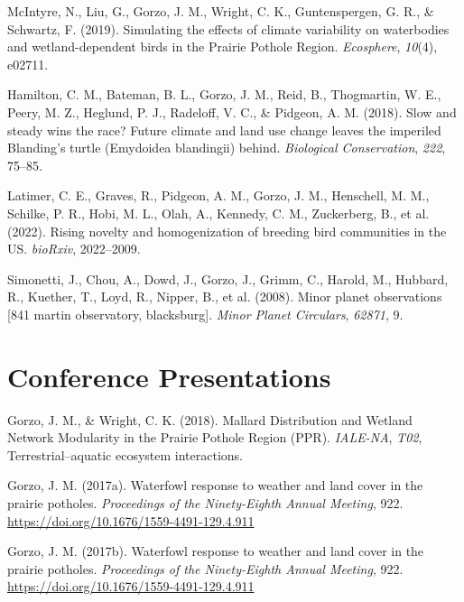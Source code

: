 \documentclass[11pt,a4paper,]{awesome-cv}
\begin{document}
\leavevmode{}%
McIntyre, N., Liu, G., Gorzo, J. M., Wright, C. K., Guntenspergen, G.
R., \& Schwartz, F. (2019). Simulating the effects of climate
variability on waterbodies and wetland-dependent birds in the Prairie
Pothole Region. \emph{Ecosphere}, \emph{10}(4), e02711.

\leavevmode{}%
Hamilton, C. M., Bateman, B. L., Gorzo, J. M., Reid, B., Thogmartin, W.
E., Peery, M. Z., Heglund, P. J., Radeloff, V. C., \& Pidgeon, A. M.
(2018). Slow and steady wins the race? Future climate and land use
change leaves the imperiled Blanding's turtle (Emydoidea blandingii)
behind. \emph{Biological Conservation}, \emph{222}, 75--85.

\leavevmode{}%
Latimer, C. E., Graves, R., Pidgeon, A. M., Gorzo, J. M., Henschell, M.
M., Schilke, P. R., Hobi, M. L., Olah, A., Kennedy, C. M., Zuckerberg,
B., et al. (2022). Rising novelty and homogenization of breeding bird
communities in the US. \emph{bioRxiv}, 2022--2009.

\leavevmode{}%
Simonetti, J., Chou, A., Dowd, J., Gorzo, J., Grimm, C., Harold, M.,
Hubbard, R., Kuether, T., Loyd, R., Nipper, B., et al. (2008). Minor
planet observations {[}841 martin observatory, blacksburg{]}.
\emph{Minor Planet Circulars}, \emph{62871}, 9.

\hypertarget{conference-presentations}{%
\section{Conference Presentations}\label{conference-presentations}}

\hypertarget{bibliography}{}
\leavevmode{}%
Gorzo, J. M., \& Wright, C. K. (2018). Mallard Distribution and Wetland
Network Modularity in the Prairie Pothole Region (PPR). \emph{IALE-NA},
\emph{T02}, Terrestrial--aquatic ecosystem interactions.

\leavevmode{}%
Gorzo, J. M. (2017a). Waterfowl response to weather and land cover in
the prairie potholes. \emph{Proceedings of the Ninety-Eighth Annual
Meeting}, 922. \url{https://doi.org/10.1676/1559-4491-129.4.911}

\leavevmode{}%
Gorzo, J. M. (2017b). Waterfowl response to weather and land cover in
the prairie potholes. \emph{Proceedings of the Ninety-Eighth Annual
Meeting}, 922. \url{https://doi.org/10.1676/1559-4491-129.4.911}
\end{document}
